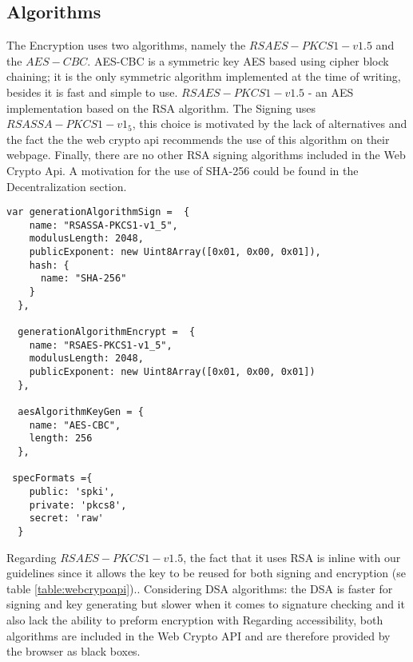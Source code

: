 \subsection{Algorithms}
The Encryption uses two algorithms, namely the $RSAES-PKCS1-v1.5$ and the $AES-CBC$.
AES-CBC is a symmetric key AES based using cipher block chaining; it is the only symmetric algorithm implemented at the time of writing, besides it is fast\cite{AESISFAST:Online} and simple to use.
$RSAES-PKCS1-v1.5$ - an AES implementation based on the RSA algorithm.
The Signing uses $RSASSA-PKCS1-v1_5$, this choice is motivated by the lack of alternatives and the fact the the web crypto api recommends the use of this algorithm on their webpage. Finally, there are no other RSA signing algorithms included in the Web Crypto Api.
A motivation for the use of SHA-256 could be found in the Decentralization section.
\begin{Code}
\begin{lstlisting}[caption={Algorithms implemented}, label={lst:api}]
  var generationAlgorithmSign =  {
    name: "RSASSA-PKCS1-v1_5",
    modulusLength: 2048,
    publicExponent: new Uint8Array([0x01, 0x00, 0x01]),
    hash: {
      name: "SHA-256"
    }
  },

  generationAlgorithmEncrypt =  {
    name: "RSAES-PKCS1-v1_5",
    modulusLength: 2048,
    publicExponent: new Uint8Array([0x01, 0x00, 0x01])
  },

  aesAlgorithmKeyGen = {
    name: "AES-CBC",
    length: 256
  },

 specFormats ={
    public: 'spki',
    private: 'pkcs8',
    secret: 'raw'
  }
\end{lstlisting}
\end{Code}
Regarding $RSAES-PKCS1-v1.5$, the fact that it uses RSA is inline with our guidelines since it allows the key to be reused for both signing and encryption (se table \ref{table:webcrypoapi})..
Considering DSA algorithms: the DSA is faster for signing and key generating but slower when it comes to signature checking and it also lack the ability to preform encryption with
Regarding accessibility, both algorithms are included in the Web Crypto API and are therefore provided by the browser as black boxes.
